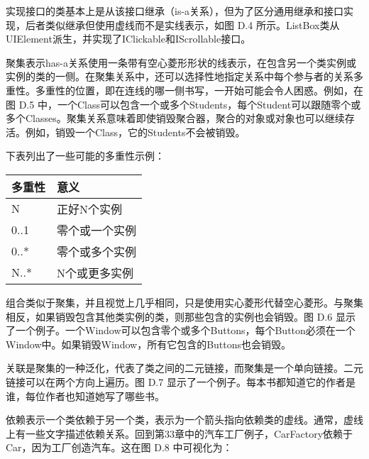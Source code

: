 
实现接口的类基本上是从该接口继承（is-a关系），但为了区分通用继承和接口实现，后者类似继承但使用虚线而不是实线表示，如图 D.4 所示。ListBox类从UIElement派生，并实现了IClickable和IScrollable接口。



聚集表示has-a关系使用一条带有空心菱形形状的线表示，在包含另一个类实例或实例的类的一侧。在聚集关系中，还可以选择性地指定关系中每个参与者的关系多重性。多重性的位置，即在连线的哪一侧书写，一开始可能会令人困惑。例如，在图 D.5 中，一个Class可以包含一个或多个Students，每个Student可以跟随零个或多个Classes。聚集关系意味着即使销毁聚合器，聚合的对象或对象也可以继续存活。例如，销毁一个Class，它的Students不会被销毁。


下表列出了一些可能的多重性示例：

\begin{longtable}{|l|l|}
\hline
\textbf{多重性} & \textbf{意义}       \\ \hline
\endfirsthead
%
\endhead
%
N                     & 正好N个实例    \\ \hline
0..1                  & 零个或一个实例   \\ \hline
0..*                  & 零个或多个实例 \\ \hline
N..*                  & N个或更多实例    \\ \hline
\end{longtable}


组合类似于聚集，并且视觉上几乎相同，只是使用实心菱形代替空心菱形。与聚集相反，如果销毁包含其他类实例的类，则那些包含的实例也会销毁。图 D.6 显示了一个例子。一个Window可以包含零个或多个Buttons，每个Button必须在一个Window中。如果销毁Window，所有它包含的Buttons也会销毁。



关联是聚集的一种泛化，代表了类之间的二元链接，而聚集是一个单向链接。二元链接可以在两个方向上遍历。图 D.7 显示了一个例子。每本书都知道它的作者是谁，每位作者也知道她写了哪些书。



依赖表示一个类依赖于另一个类，表示为一个箭头指向依赖类的虚线。通常，虚线上有一些文字描述依赖关系。回到第33章中的汽车工厂例子，CarFactory依赖于Car，因为工厂创造汽车。这在图 D.8 中可视化为：


